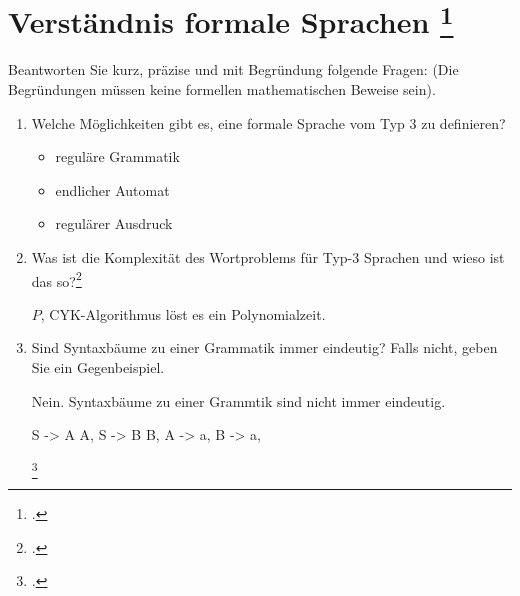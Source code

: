 \documentclass{lehramt-informatik-aufgabe}
\begin{document}
\section{Verständnis formale Sprachen
\footcite{66115:2016:03}}

Beantworten Sie kurz, präzise und mit Begründung folgende Fragen: (Die
Begründungen müssen keine formellen mathematischen Beweise sein).

\begin{enumerate}


\item Welche Möglichkeiten gibt es, eine formale Sprache vom Typ 3 zu
definieren?

\begin{liAntwort}
\begin{itemize}
\item reguläre Grammatik
\item endlicher Automat
\item regulärer Ausdruck
\end{itemize}
\end{liAntwort}


\item Was ist die Komplexität des Wortproblems für Typ-3 Sprachen und
wieso ist das so?\footcite[Aufgabe 5a)]{theo:ab:5}

\begin{liAntwort}
$P$, CYK-Algorithmus löst es ein Polynomialzeit.
\end{liAntwort}


\item Sind Syntaxbäume zu einer Grammatik immer eindeutig? Falls nicht,
geben Sie ein Gegenbeispiel.

\begin{liAntwort}
Nein. Syntaxbäume zu einer Grammtik sind nicht immer eindeutig.



\begin{liProduktionsRegeln}
S -> A A,
S -> B B,
A -> a,
B -> a,
\end{liProduktionsRegeln}


\footcite{wiki:mehrdeutig}
\end{liAntwort}


\end{enumerate}
\end{document}
